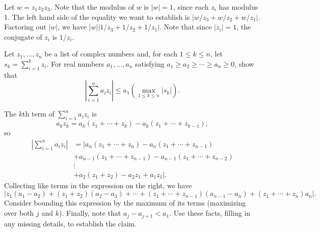 \smallskip
\begin{hint}
Let $w =  z_1 z_2 z_3$. Note that the modulus of $w$ is $|w| = 1$, since each $z_i$ has modulus 1.
The left hand side of the equality we want to establish is
$| w/z_3 + w/z_2 + w/z_1 |$.
Factoring out $|w|$, we have $|w| |1/z_3 + 1/z_2 + 1/z_1|$.
Note that since $|z_i|=1$, the conjugate of $z_i$ is $1/z_i$.
\end{hint}
\probskip

\begin{prob} 
Let $z_1, \dots, z_n$ be a list of complex
numbers and, for each $1 \leq k \leq n$, 
let $s_k = \sum_{i=1}^k z_i$. For real numbers
$a_1, \dots, a_n$ satisfying 
$a_1 \geq a_2 \geq \cdots \geq a_n \geq 0$, 
show that
\begin{equation}
\label{eq:Abels}  
\left| \sum_{i=1}^n a_i z_i \right| 
\leq a_1 \left( \max_{1 \leq k \leq n} |s_k|\right).
\end{equation}
\end{prob}
\smallskip
\begin{hint}
The $k$th term of $\sum_{i=1}^n a_i z_i$ is 
\[
a_k z_k = a_k (z_1+\cdots + z_k) - a_k (z_1+\cdots + z_{k-1}),
\]
so
\begin{align*}
\left| \sum_{i=1}^n a_i z_i \right|  
&= \left|a_n (z_1+\cdots + z_n) - a_n (z_1+\cdots + z_{n-1}) \right.\\
&+ a_{n-1} (z_1+\cdots + z_{n-1}) - a_{n-1} (z_1+\cdots + z_{n-2}) \\
& \vdots\\
&+ a_2 (z_1+z_2) - a_2 z_1 + \left.a_1 z_1\right|.
\end{align*}
Collecting like terms in the expression on the right, we have
\[
\left| z_1(a_1-a_2)+ (z_1+ z_2)(a_2-a_3) + \cdots + (z_1+\cdots +
  z_{n-1})(a_{n-1}-a_n) + (z_1+\cdots + z_{n})a_n \right|. \]
Consider bounding this expression by the maximum of its terms 
(maximizing over both $j$ and $k$).  Finally, note that $a_j - a_{j+1} < a_1$.
Use these facts, filling in any missing details, to establish the claim.  
\end{hint}
\probskip



